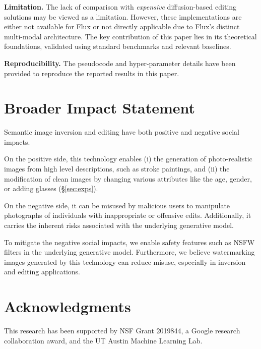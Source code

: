 \documentclass{article} %
\theoremstyle{plain}
\begin{document}
\noindent\textbf{Limitation.} 
The lack of comparison with \textit{expensive} diffusion-based editing solutions may be viewed as a limitation. 
However, these implementations are either not available for Flux or not directly applicable due to Flux's distinct multi-modal architecture. 
The key contribution of this paper lies in its theoretical foundations, validated using standard benchmarks and relevant baselines. 


\noindent\textbf{Reproducibility.} The pseudocode and hyper-parameter details have been provided to reproduce the reported results in this paper. 


\section*{Broader Impact Statement}
\label{sec:broad-impact}
Semantic image inversion and editing have both positive and negative social impacts.

On the positive side, this technology enables (i) the generation of photo-realistic images from high level descriptions, such as stroke paintings, and (ii) the modification of clean images by changing various attributes like the age, gender, or adding glasses (\S\ref{sec:exps}). 

On the negative side, it can be misused by malicious users to manipulate photographs of individuals with inappropriate or offensive edits. 
Additionally, it carries the inherent risks associated with the underlying generative model.

To mitigate the negative social impacts, we enable safety features such as NSFW filters in the underlying generative model. 
Furthermore, we believe watermarking images generated by this technology can reduce misuse, especially in inversion and editing applications. 

\section*{Acknowledgments}
This research has been supported by NSF Grant 2019844, a Google research collaboration award, and the UT Austin Machine Learning Lab.






\clearpage
\pagebreak
\appendix
\end{document}
